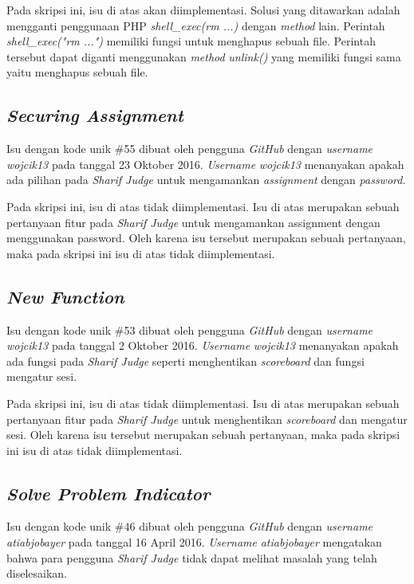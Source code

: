 Pada skripsi ini, isu di atas akan diimplementasi. Solusi yang ditawarkan adalah mengganti penggunaan PHP \textit{shell\_exec(rm ...)} dengan \textit{method} lain.  Perintah \textit{shell\_exec("rm ...")} memiliki fungsi untuk menghapus sebuah file. Perintah tersebut dapat diganti menggunakan \textit{method} \textit{unlink()} yang memiliki fungsi sama yaitu menghapus sebuah file.

\subsection{\textit{Securing Assignment}}
Isu dengan kode unik \#55 dibuat oleh pengguna \textit{GitHub} dengan \textit{username} \textit{wojcik13} pada tanggal 23 Oktober 2016. \textit{Username} \textit{wojcik13} menanyakan apakah ada pilihan pada \textit{Sharif Judge} untuk mengamankan \textit{assignment} dengan \textit{password}.

Pada skripsi ini, isu di atas tidak diimplementasi. Isu di atas merupakan sebuah pertanyaan fitur pada \textit{Sharif Judge} untuk mengamankan assignment dengan menggunakan password. Oleh karena isu tersebut merupakan sebuah pertanyaan, maka pada skripsi ini isu di atas tidak diimplementasi.

\subsection{\textit{New Function}}
Isu dengan kode unik \#53 dibuat oleh pengguna \textit{GitHub} dengan \textit{username} \textit{wojcik13} pada tanggal 2 Oktober 2016. \textit{Username} \textit{wojcik13} menanyakan apakah ada fungsi pada \textit{Sharif Judge} seperti menghentikan \textit{scoreboard} dan fungsi mengatur sesi. 

Pada skripsi ini, isu di atas tidak diimplementasi. Isu di atas merupakan sebuah pertanyaan fitur pada \textit{Sharif Judge} untuk menghentikan \textit{scoreboard} dan mengatur sesi. Oleh karena isu tersebut merupakan sebuah pertanyaan, maka pada skripsi ini isu di atas tidak diimplementasi.

\subsection{\textit{Solve Problem Indicator}}
Isu dengan kode unik \#46 dibuat oleh pengguna \textit{GitHub} dengan \textit{username} \textit{atiabjobayer} pada tanggal 16 April 2016. \textit{Username} \textit{atiabjobayer} mengatakan bahwa para pengguna \textit{Sharif Judge} tidak dapat melihat masalah yang telah diselesaikan.

